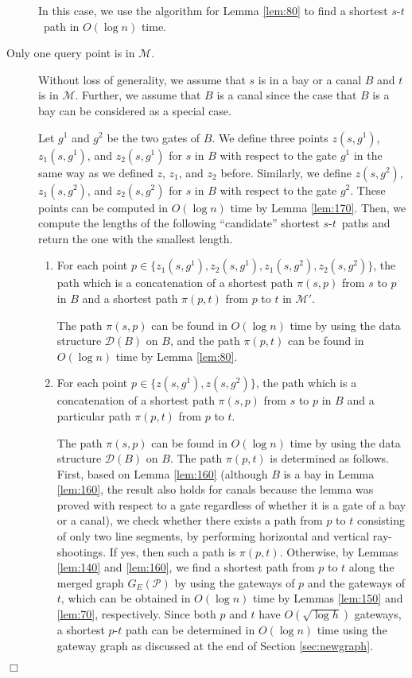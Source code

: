 \documentclass[english,runningheads,11pt]{llncs}
\def\calP{\mathcal{P}}
\def\calM{\mathcal{M}}
\def\calD{\mathcal{D}}
\def\st{$s$-$t$}
\newenvironment{proof}{\noindent {\textbf{Proof:}}\rm}{\hfill $\Box$\rm}
\begin{document}
\begin{proof}
\begin{description}
In this case, we use the
algorithm for Lemma \ref{lem:80} to find a shortest \st\ path in
$O(\log n)$ time.

\item[Only one query point is in $\calM$.]

Without loss of generality, we assume that $s$ is in a bay or a canal $B$ and
$t$ is in $\calM$. Further, we assume that $B$ is a canal since the
case that $B$ is a bay can be considered as a special case.

Let $g^1$ and $g^2$ be the two gates of $B$. We define three points
$z(s,g^1)$, $z_1(s,g^1)$,
and $z_2(s,g^1)$ for $s$ in $B$ with respect to the gate $g^1$ in the same way as we
defined $z$, $z_1$, and $z_2$ before. Similarly, we define $z(s,g^2)$, $z_1(s,g^2)$,
and $z_2(s,g^2)$ for $s$ in $B$ with respect to the gate $g^2$.  These points
can be computed in $O(\log n)$ time by Lemma \ref{lem:170}. Then, we
compute the lengths of the following ``candidate'' shortest \st\ paths and
return the one with the smallest length.

\begin{enumerate}
\item
For each point $p\in \{z_1(s,g^1),z_2(s,g^1),z_1(s,g^2),z_2(s,g^2)\}$,
the path which is a concatenation of a shortest path $\pi(s,p)$ from $s$ to $p$
in $B$ and a shortest path $\pi(p,t)$ from $p$ to $t$ in $\calM'$.

The path $\pi(s,p)$ can be found in $O(\log n)$ time by using the data structure
$\calD(B)$ on $B$, and the path $\pi(p,t)$ can be found in
$O(\log n)$ time by Lemma \ref{lem:80}.

\item
For each point $p\in \{z(s,g^1),z(s,g^2)\}$, the path which is a
concatenation of a shortest path $\pi(s,p)$ from $s$ to $p$
in $B$ and a particular path $\pi(p,t)$ from $p$ to $t$.

The path $\pi(s,p)$ can be found in $O(\log n)$ time by using the data structure
$\calD(B)$ on $B$. The path $\pi(p,t)$ is determined as follows.
First, based on Lemma \ref{lem:160} (although $B$ is a bay in
Lemma \ref{lem:160}, the result also holds for canals because the lemma
was proved with respect to a gate regardless of whether it is a gate of
a bay or a canal), we check whether there exists a
path from $p$ to $t$ consisting of only two line segments, by performing
horizontal and vertical ray-shootings. If yes, then such a path is
$\pi(p,t)$. Otherwise, by Lemmas \ref{lem:140} and \ref{lem:160}, we
find a shortest path from $p$ to $t$ along the merged graph $G_E(\calP)$
by using the gateways of $p$ and the gateways of $t$, which can be obtained in $O(\log n)$
time by Lemmas \ref{lem:150} and \ref{lem:70}, respectively.
Since both $p$ and $t$ have
$O(\sqrt{\log h})$ gateways, a shortest $p$-$t$ path can be determined
in $O(\log n)$ time using the gateway graph as discussed at the end of
Section \ref{sec:newgraph}.
\end{enumerate}


\end{description}
\end{proof}
\end{document}
